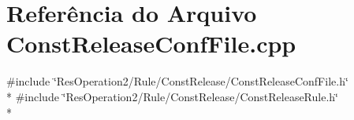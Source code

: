 \section{Referência do Arquivo Const\+Release\+Conf\+File.\+cpp}
\label{_const_release_conf_file_8cpp}
{\ttfamily \#include \char`\"{}Res\+Operation2/\+Rule/\+Const\+Release/\+Const\+Release\+Conf\+File.\+h\char`\"{}}\\*
{\ttfamily \#include \char`\"{}Res\+Operation2/\+Rule/\+Const\+Release/\+Const\+Release\+Rule.\+h\char`\"{}}\\*

